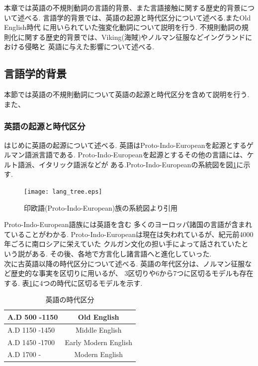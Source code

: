 
本章では英語の不規則動詞の言語的背景、また言語接触に関する歴史的背景について述べる.
言語学的背景では、英語の起源と時代区分について述べる.またOld English時代
に用いられていた強変化動詞について説明を行う.
不規則動詞の規則化に関する歴史的背景では、Viking(海賊)やノルマン征服などイングランドにおける侵略と
英語に与えた影響について述べる.


\subsection{言語学的背景}\label{sec:div}
本節では英語の不規則動詞について英語の起源と時代区分を含めて説明を行う.
また、

\subsubsection{英語の起源と時代区分}

はじめに英語の起源について述べる.
英語はProto-Indo-Europeanを起源とするゲルマン語派言語である\cite{eng_history}.
Proto-Indo-Europeanを起源とするその他の言語には、ケルト語派、イタリック語派などが
ある.Proto-Indo-Europeanの系統図を図\ref{fig:tree}に示す.

\begin{figure}[htbp]
 \centering
 \texttt{[image: lang\_tree.eps]}
 \caption{印欧語(Proto-Indo-European)族の系統図\cite{eng_history}より引用\label{fig:tree}}
\end{figure}

Proto-Indo-European語族には英語を含む
多くのヨーロッパ諸国の言語が含まれていることがわかる.
Proto-Indo-Europeanは現在は失われているが、紀元前4000年ごろに南ロシアに栄えていた
クルガン文化の担い手によって話されていたという説がある\cite{eng_history}.
その後、各地で方言化し諸言語へと進化していった.\\

次に古英語以降の時代区分について述べる.
英語の年代区分は、ノルマン征服など歴史的な事実を区切りに用いるが、
3区切りや6から7つに区切るモデルも存在する.
表\ref{tab:eng_div_table}に4つの時代に区切るモデル\cite{english_div}を示す.


\begin{table}[htbp]
 \centering
 \caption{英語の時代区分\label{tab:eng_div_table}}
 \small
 \begin{tabular}{l|c}
  \hline
  A.D 500 -1150 & Old English \\
  \hline
  A.D 1150 -1450 & Middle English \\
  \hline
  A.D 1450 -1700 & Early Modern English \\
  \hline
  A.D 1700 - & Modern English \\
  \hline
\end{tabular}
\end{table}

